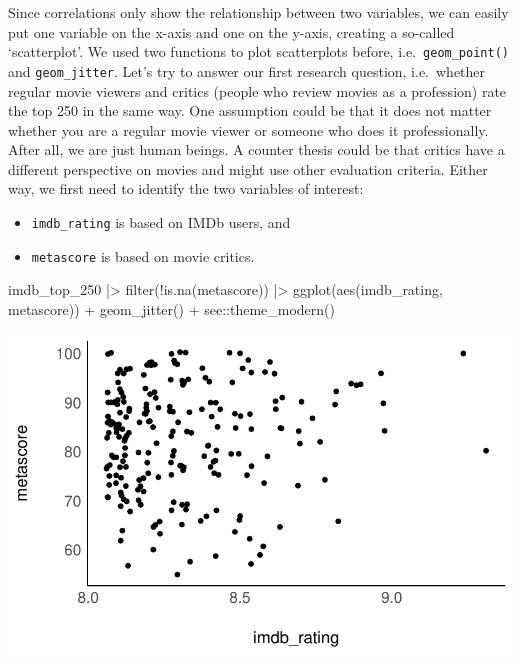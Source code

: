 \documentclass[
  letterpaper,
]{krantz}
\makeatletter
\newenvironment{Shaded}{\begin{snugshade}}{\end{snugshade}}
\newcommand{\FunctionTok}[1]{\textcolor[rgb]{0.28,0.35,0.67}{#1}}
\newcommand{\NormalTok}[1]{\textcolor[rgb]{0.00,0.23,0.31}{#1}}
\newcommand{\SpecialCharTok}[1]{\textcolor[rgb]{0.37,0.37,0.37}{#1}}
\newenvironment{kframe}{%
\medskip{}
\setlength{\fboxsep}{.8em}
 \def\at@end@of@kframe{}%
 \ifinner\ifhmode%
  \def\at@end@of@kframe{\end{minipage}}%
  \begin{minipage}{\columnwidth}%
 \fi\fi%
 \def\FrameCommand##1{\hskip\@totalleftmargin \hskip-\fboxsep
 \colorbox{shadecolor}{##1}\hskip-\fboxsep
     \hskip-\linewidth \hskip-\@totalleftmargin \hskip\columnwidth}%
 \MakeFramed {\advance\hsize-\width
   \@totalleftmargin\z@ \linewidth\hsize
   \@setminipage}}%
 {\par\unskip\endMakeFramed%
 \at@end@of@kframe}
\renewenvironment{Shaded}{\begin{kframe}}{\end{kframe}}
\makeatother
\begin{document}
Since correlations only show the relationship between two variables, we
can easily put one variable on the x-axis and one on the y-axis,
creating a so-called `scatterplot'. We used two functions to plot
scatterplots before, i.e.~\texttt{geom\_point()} and
\texttt{geom\_jitter}. Let's try to answer our first research question,
i.e.~whether regular movie viewers and critics (people who review movies
as a profession) rate the top 250 in the same way. One assumption could
be that it does not matter whether you are a regular movie viewer or
someone who does it professionally. After all, we are just human beings.
A counter thesis could be that critics have a different perspective on
movies and might use other evaluation criteria. Either way, we first
need to identify the two variables of interest:

\begin{itemize}
\item
  \texttt{imdb\_rating} is based on IMDb users, and
\item
  \texttt{metascore} is based on movie critics.
\end{itemize}

\begin{Shaded}
\begin{Highlighting}[]
\NormalTok{imdb\_top\_250 }\SpecialCharTok{|\textgreater{}}
  \FunctionTok{filter}\NormalTok{(}\SpecialCharTok{!}\FunctionTok{is.na}\NormalTok{(metascore)) }\SpecialCharTok{|\textgreater{}}
  \FunctionTok{ggplot}\NormalTok{(}\FunctionTok{aes}\NormalTok{(imdb\_rating, metascore)) }\SpecialCharTok{+}
  \FunctionTok{geom\_jitter}\NormalTok{() }\SpecialCharTok{+}
\NormalTok{  see}\SpecialCharTok{::}\FunctionTok{theme\_modern}\NormalTok{()}
\end{Highlighting}
\end{Shaded}

\includegraphics{10_correlations_files/figure-pdf/correlation-imdb-rating-metascore-1.pdf}
\end{document}

